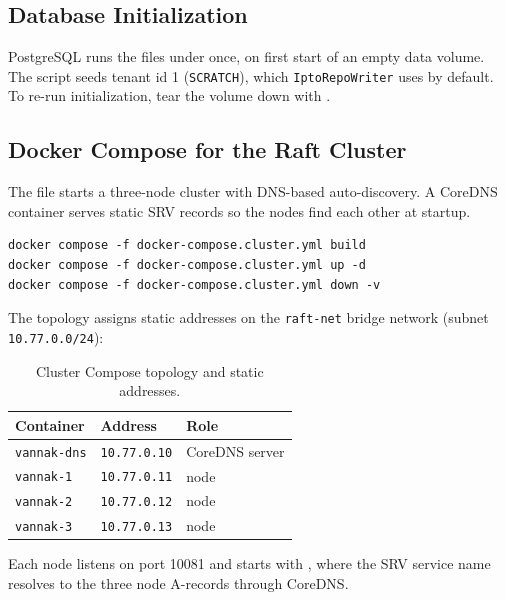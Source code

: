 \subsection{Database Initialization}

PostgreSQL runs the files under  once, on
first start of an empty data volume. The  script seeds tenant
id 1 (\texttt{SCRATCH}), which \texttt{IptoRepoWriter} uses by default. To
re-run initialization, tear the volume down with .

\subsection{Docker Compose for the Raft Cluster}

The file  starts a three-node \vannak{}
\raft{} cluster with DNS-based auto-discovery. A CoreDNS container serves static
SRV records so the nodes find each other at startup.

\begin{lstlisting}[numbers=none]
docker compose -f docker-compose.cluster.yml build
docker compose -f docker-compose.cluster.yml up -d
docker compose -f docker-compose.cluster.yml down -v
\end{lstlisting}

The topology assigns static addresses on the \texttt{raft-net} bridge network
(subnet \texttt{10.77.0.0/24}):

\begin{table}[htbp]
\centering
\begin{tabular}{lll}
\hline
Container & Address & Role \\
\hline
\texttt{vannak-dns} & \texttt{10.77.0.10} & CoreDNS server \\
\texttt{vannak-1} & \texttt{10.77.0.11} & \raft{} node \\
\texttt{vannak-2} & \texttt{10.77.0.12} & \raft{} node \\
\texttt{vannak-3} & \texttt{10.77.0.13} & \raft{} node \\
\hline
\end{tabular}
\caption{Cluster Compose topology and static addresses.}
\end{table}

Each node listens on port 10081 and starts with
, where
the SRV service name resolves to the three node A-records through CoreDNS.

